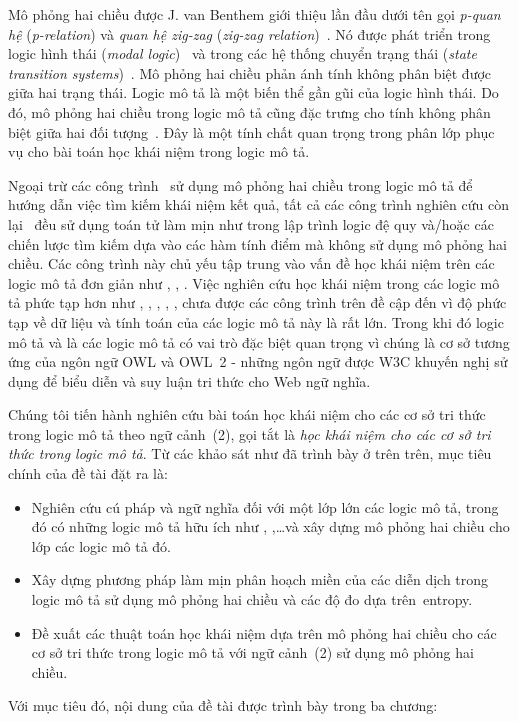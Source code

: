 Mô phỏng hai chiều được J. van Benthem giới thiệu lần đầu dưới tên gọi {\em p-quan hệ} ({\em p-relation}) và {\em quan hệ zig-zag} ({\em zig-zag relation})~\cite{Benthem2001,Blackburn2001,Blackburn2006}. Nó được phát triển trong logic hình thái ({\em modal logic})~\cite{Benthem2001,Blackburn2001,Benthem2010} và trong các hệ thống chuyển trạng thái ({\em state transition systems})~\cite{Park1981,Hennessy1985}. Mô phỏng hai chiều phản ánh tính không phân biệt được giữa hai trạng thái.
Logic mô tả là một biến thể gần gũi của logic hình thái. Do đó, mô phỏng hai chiều trong logic mô tả cũng đặc trưng cho tính không phân biệt giữa hai đối tượng~\cite{Divroodi2011}. Đây là một tính chất quan trọng trong phân lớp phục vụ cho bài toán học khái niệm trong logic mô tả.

Ngoại trừ các công trình~\cite{Nguyen2013,Tran2012,Ha2012} sử dụng mô phỏng hai chiều trong logic mô tả để hướng dẫn việc tìm kiếm khái niệm kết quả, tất cả các công trình nghiên cứu còn lại~\cite{Quinlan1990,Cohen1994,Lambrix1998,Badea2000,Iannone2007,Fanizzi2004,Fanizzi2008,Lehmann2007,Fanizzi2010,Lehmann2010,Nguyen2013} đều sử dụng toán tử làm mịn như trong lập trình logic đệ quy và/hoặc các chiến lược tìm kiếm dựa vào các hàm tính điểm mà không sử dụng mô phỏng hai chiều.
Các công trình này chủ yếu tập trung vào vấn đề học khái niệm trên các logic mô tả đơn giản như \ALER, \ALN, \ALC. 
%
Việc nghiên cứu học khái niệm trong các logic mô tả phức tạp hơn như \ALCN, \ALCQ, \ALCIQ, \SHIQ, \SHOIQ, \SROIQ chưa được các công trình trên đề cập đến vì độ phức tạp về dữ liệu và tính toán của các logic mô tả này là rất lớn. Trong khi đó logic mô tả \SHOIQ và \SROIQ là các logic mô tả có vai trò đặc biệt quan trọng vì chúng là cơ sở tương ứng của ngôn ngữ OWL và OWL~2 - những ngôn ngữ được W3C khuyến nghị sử dụng để biểu diễn và suy luận tri thức cho Web ngữ nghĩa.

Chúng tôi tiến hành nghiên cứu bài toán học khái niệm cho các cơ sở tri thức trong logic mô tả theo ngữ cảnh~(2), gọi tắt là {\em học khái niệm cho các cơ sở tri thức trong logic mô tả}. Từ các khảo sát như đã trình bày ở trên trên, mục tiêu chính của đề tài đặt ra là:
\begin{itemize}
	\item Nghiên cứu cú pháp và ngữ nghĩa đối với một lớp lớn các logic mô tả, trong đó có những logic mô tả hữu ích như \SHOIQ, \SROIQ,\ldots và xây dựng mô phỏng hai chiều cho lớp các logic mô tả đó.

	\item Xây dựng phương pháp làm mịn phân hoạch miền của các diễn dịch trong logic mô tả sử dụng mô phỏng hai chiều và các độ đo dựa trên~entropy.
	
	\item Đề xuất các thuật toán học khái niệm dựa trên mô phỏng hai chiều cho các cơ sở tri thức trong logic mô tả với ngữ cảnh~(2) sử dụng mô phỏng hai chiều.
\end{itemize}
Với mục tiêu đó, nội dung của đề tài được trình bày trong ba chương:

